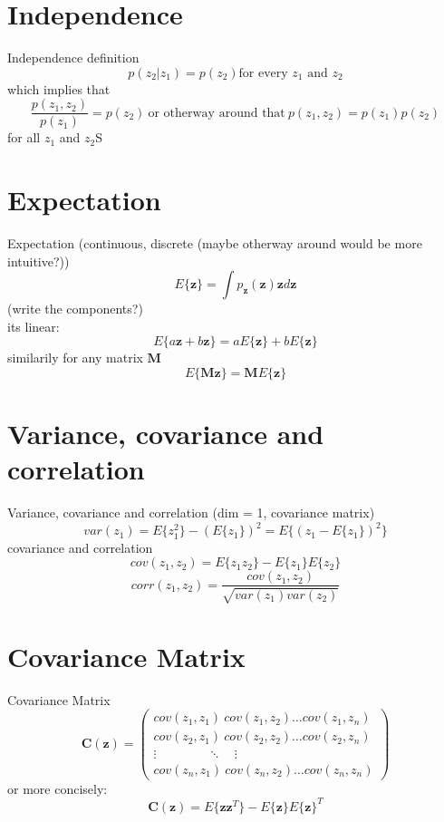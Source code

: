 \documentclass{beamer}
\begin{document}
\section{Independence}

\begin{frame}{Independence}
  definition
  \[
  p(z_2|z_1) = p(z_2) \text{for every $z_1$ and $z_2$}
  \]
  which implies that
  \[
  \frac{p(z_1, z_2)}{p(z_1)} = p(z_2) \ \text{or otherway around that} \ p(z_1, z_2) = p(z_1)p(z_2)
  \]
  for all $z_1$ and $z_2$S
\end{frame}

\section{Expectation}

\begin{frame}{Expectation}
  (continuous, discrete (maybe otherway around would be more intuitive?))
  \[
  E\{\mathbf{z}\} = \int p_{\mathbf{z}}(\mathbf{z})\mathbf{z}d\mathbf{z}
  \]
  (write the components?)\\
  its linear:
  \[
  E\{a\mathbf{z} + b\mathbf{z}\}  = aE\{\mathbf{z}\} + bE\{\mathbf{z}\}
  \]
  similarily for any matrix $\mathbf{M}$
  \[
  E\{\mathbf{Mz}\} = \mathbf{M}E\{\mathbf{z}\}
  \]
\end{frame}

\section{Variance, covariance and correlation}

\begin{frame}{Variance, covariance and correlation}
  (dim = 1, covariance matrix)
  \[
  var(z_1)= E\{z_1^2\}-(E\{z_1\})^2 = E\{(z_1-E\{z_1\})^2\}
  \]
  covariance and correlation
  \[
  cov(z_1, z_2) = E\{z_1 z_2\} - E\{z_1\}E\{z_2\}
  \]
  \[
  corr(z_1,z_2) = \frac{cov(z_1, z_2)}{\sqrt{var(z_1)var(z_2)}}
  \]

\end{frame}

\section{Covariance Matrix}

\begin{frame}{Covariance Matrix}
  \[
  \mathbf{C}(\mathbf{z}) =
  \begin{pmatrix}
    cov(z_1, z_1) \ cov(z_1, z_2) \ldots cov(z_1, z_n) \\
    cov(z_2, z_1) \ cov(z_2, z_2) \ldots cov(z_2, z_n) \\
    \vdots \qquad \qquad \ddots \quad \vdots \\
    cov(z_n, z_1) \ cov(z_n, z_2) \ldots cov(z_n, z_n)
  \end{pmatrix}
  \]
  or more concisely:
  \[ \mathbf{C}(\mathbf{z}) =
  E\{\mathbf{zz}^T\} - E\{\mathbf{z}\} E\{\mathbf{z}\}^T\]
\end{frame}
\end{document}
